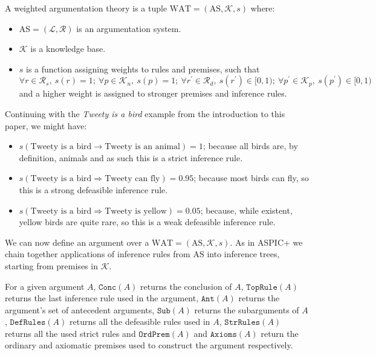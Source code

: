 \documentclass[runningheads]{llncs}
\newcommand{\comment}[1]{\textcolor{red}{#1}}
\newcommand{\R}{\mathcal{R}}
\newcommand{\Rs}{\mathcal{R}_s}
\newcommand{\Rd}{\mathcal{R}_d}
\newcommand{\La}{\mathcal{L}}
\newcommand{\K}{\mathcal{K}}
\newcommand{\Kn}{\mathcal{K}_n}
\newcommand{\Kp}{\mathcal{K}_p}
\newcommand{\pr}{^\prime}
\newcommand{\Ord}{\texttt{OrdPrem}}
\newcommand{\Ax}{\texttt{Axioms}}
\newcommand{\Conc}{\texttt{Conc}}
\newcommand{\DefRules}{\texttt{DefRules}}
\newcommand{\StrRules}{\texttt{StrRules}}
\newcommand{\TopRule}{\texttt{TopRule}}
\newcommand{\Ant}{\texttt{Ant}}
\newcommand{\Sub}{\texttt{Sub}}
\begin{document}
\begin{definition}\label{WAT}
A weighted argumentation theory is a tuple $\text{WAT} = ( \text{AS}, \K, s )$ where:
\begin{itemize}
    \item $\text{AS} = ( \La,\R )$ is an argumentation system. %
    \item $\K$ is a knowledge base.
    \item $s$ is a function assigning weights to rules and premises, such that $\forall r \in \Rs,\ s(r) = 1;\ \forall p \in \Kn,\ s(p) = 1;\ \forall r\pr \in \Rd,\ s(r\pr) \in [0,1);\ \forall p\pr \in \Kp,\ s(p\pr) \in [0,1)$ and a higher weight is assigned to stronger premises and inference rules.
\end{itemize}
\end{definition}

\begin{example}
Continuing with the \textit{Tweety is a bird} example from the introduction to this paper, we might have:
\begin{itemize}
    \item $s(\text{Tweety is a bird} \rightarrow \text{Tweety is an animal}) = 1$; because all birds are, by definition, animals and as such this is a strict inference rule.
    \item $s(\text{Tweety is a bird} \Rightarrow \text{Tweety can fly}) = 0.95$; because most birds can fly, so this is a strong defeasible inference rule.
    \item $s(\text{Tweety is a bird} \Rightarrow \text{Tweety is yellow}) = 0.05$; because, while existent, yellow birds are quite rare, so this is a weak defeasible inference rule.
\end{itemize}
\end{example}

We can now define an argument over a $\text{WAT} = ( \text{AS}, \K, s )$. As in ASPIC+ \cite{DBLP:journals/argcom/ModgilP14} we chain together applications of inference rules from $\text{AS}$ into inference trees, starting from premises in $\K$.

For a given argument $A$, $\Conc(A)$ returns the conclusion of $A$, $\TopRule(A)$ returns the last inference rule used in the argument, $\Ant(A)$ returns the argument's set of antecedent arguments, $\Sub(A)$ returns the subarguments of $A$, $\DefRules(A)$ returns all the defeasible rules used in $A$, $\StrRules(A)$ returns all the used strict rules and $\Ord(A)$ and $\Ax(A)$ return the ordinary and axiomatic premises used to construct the argument respectively.
\end{document}
